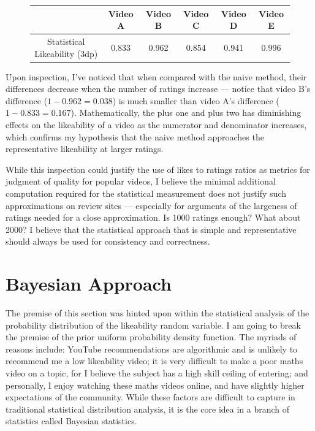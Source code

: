\documentclass[a4paper,11pt]{article}
\begin{document}
\begin{figure}[H]
    \centering
    \begin{tabular}{c|c|c|c|c|c}
        & Video A & Video B & Video C & Video D & Video E \\
        \hline
        \hline
        Statistical Likeability (3dp) & 0.833 & 0.962 & 0.854 & 0.941 & 0.996
    \end{tabular}
    \label{tbl:stat}
\end{figure}

Upon inspection, I've noticed that when compared with the naive method, their differences decrease when the number of ratings increase --- notice that video B's difference ($1-0.962 = 0.038$) is much smaller than video A's difference ($1-0.833= 0.167$). Mathematically, the plus one and plus two has diminishing effects on the likeability of a video as the numerator and denominator increases, which confirms my hypothesis that the naive method approaches the representative likeability at larger ratings.

While this inspection could justify the use of likes to ratings ratios as metrics for judgment of quality for popular videos, I believe the minimal additional computation required for the statistical measurement does not justify such approximations on review sites --- especially for arguments of the largeness of ratings needed for a close approximation. Is 1000 ratings enough? What about 2000? I believe that the statistical approach that is simple and representative should always be used for consistency and correctness.

\section{Bayesian Approach}
The premise of this section was hinted upon within the statistical analysis of the probability distribution of the likeability random variable. I am going to break the premise of the prior uniform probability density function. The myriads of reasons include: YouTube recommendations are algorithmic and is unlikely to recommend me a low likeability video; it is very difficult to make a poor maths video on a topic, for I believe the subject has a high skill ceiling of entering; and personally, I enjoy watching these maths videos online, and have slightly higher expectations of the community. While these factors are difficult to capture in traditional statistical distribution analysis, it is the core idea in a branch of statistics called Bayesian statistics.
\end{document}
